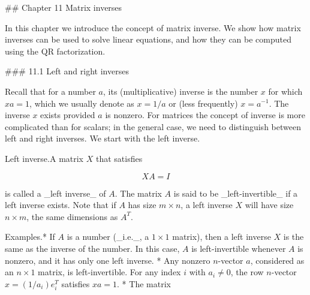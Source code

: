 

## Chapter 11 Matrix inverses

In this chapter we introduce the concept of matrix inverse. We show how matrix inverses can be used to solve linear equations, and how they can be computed using the QR factorization.

### 11.1 Left and right inverses

Recall that for a number \(a\), its (multiplicative) inverse is the number \(x\) for which \(xa=1\), which we usually denote as \(x=1/a\) or (less frequently) \(x=a^{-1}\). The inverse \(x\) exists provided \(a\) is nonzero. For matrices the concept of inverse is more complicated than for scalars; in the general case, we need to distinguish between left and right inverses. We start with the left inverse.

Left inverse.A matrix \(X\) that satisfies

\[XA=I\]

is called a _left inverse_ of \(A\). The matrix \(A\) is said to be _left-invertible_ if a left inverse exists. Note that if \(A\) has size \(m\times n\), a left inverse \(X\) will have size \(n\times m\), the same dimensions as \(A^{T}\).

Examples.* If \(A\) is a number (_i.e._, a \(1\times 1\) matrix), then a left inverse \(X\) is the same as the inverse of the number. In this case, \(A\) is left-invertible whenever \(A\) is nonzero, and it has only one left inverse.
* Any nonzero \(n\)-vector \(a\), considered as an \(n\times 1\) matrix, is left-invertible. For any index \(i\) with \(a_{i}\neq 0\), the row \(n\)-vector \(x=(1/a_{i})e_{i}^{T}\) satisfies \(xa=1\).
* The matrix